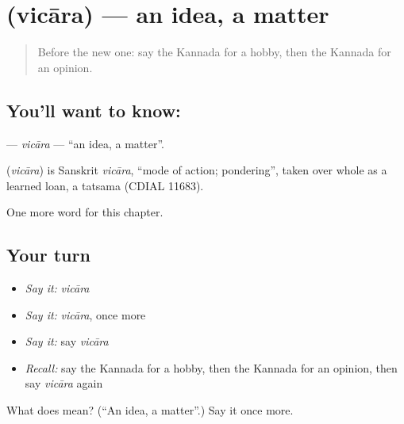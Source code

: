 \section[\texorpdfstring{\kn{ವಿಚಾರ} (vicāra)}{ವಿಚಾರ (vicāra)}]{ (vicāra) — an idea, a matter}

\label{lesson:KA-C228-vicara}



\begin{quote}
Before the new one: say the Kannada for a hobby, then the Kannada for an opinion.
\end{quote}

\subsection*{You'll want to know: }
\textbf{} — \emph{vicāra} — \textquotedblleft{}an idea, a matter\textquotedblright{}.

\begin{cousinweb}
\textbf{} (\emph{vicāra}) is Sanskrit \emph{vicāra}, \textquotedblleft{}mode of action; pondering\textquotedblright{}, taken over whole as a learned loan, a tatsama (CDIAL 11683).
\end{cousinweb}

\begin{grammarlens}[title={What you've built}]
One more word for this chapter.
\end{grammarlens}

\subsection*{Your turn}
\begin{itemize}
\raggedright
  \item \emph{Say it:} \emph{vicāra}
  \item \emph{Say it:} \emph{vicāra}, once more
  \item \emph{Say it:} say \emph{vicāra}
  \item \emph{Recall:} say the Kannada for a hobby, then the Kannada for an opinion, then say \emph{vicāra} again
\end{itemize}

\begin{tcolorbox}[breakable,colback=teal!4,colframe=teal!35!black,title={Before you move on}]
What does  mean? (\textquotedblleft{}An idea, a matter\textquotedblright{}.) Say it once more.
\end{tcolorbox}
